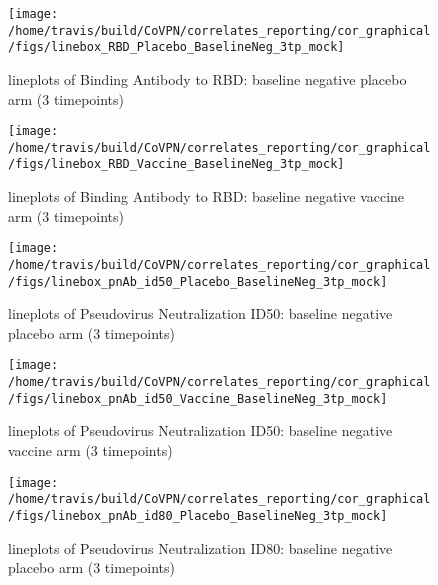 \documentclass[]{book}
\theoremstyle{definition}
\theoremstyle{definition}
\theoremstyle{definition}
\newcommand{\1}{\mathbbm{1}}
\begin{document}
\clearpage
\begin{figure}[H]

{\centering \texttt{[image: /home/travis/build/CoVPN/correlates\_reporting/cor\_graphical/figs/linebox\_RBD\_Placebo\_BaselineNeg\_3tp\_mock]} 

}

\caption{lineplots of Binding Antibody to RBD: baseline negative placebo arm (3 timepoints)}\label{fig:unnamed-chunk-45}
\end{figure}

\clearpage
\begin{figure}[H]

{\centering \texttt{[image: /home/travis/build/CoVPN/correlates\_reporting/cor\_graphical/figs/linebox\_RBD\_Vaccine\_BaselineNeg\_3tp\_mock]} 

}

\caption{lineplots of Binding Antibody to RBD: baseline negative vaccine arm (3 timepoints)}\label{fig:unnamed-chunk-46}
\end{figure}

\clearpage
\begin{figure}[H]

{\centering \texttt{[image: /home/travis/build/CoVPN/correlates\_reporting/cor\_graphical/figs/linebox\_pnAb\_id50\_Placebo\_BaselineNeg\_3tp\_mock]} 

}

\caption{lineplots of Pseudovirus Neutralization ID50: baseline negative placebo arm (3 timepoints)}\label{fig:unnamed-chunk-47}
\end{figure}

\clearpage
\begin{figure}[H]

{\centering \texttt{[image: /home/travis/build/CoVPN/correlates\_reporting/cor\_graphical/figs/linebox\_pnAb\_id50\_Vaccine\_BaselineNeg\_3tp\_mock]} 

}

\caption{lineplots of Pseudovirus Neutralization ID50: baseline negative vaccine arm (3 timepoints)}\label{fig:unnamed-chunk-48}
\end{figure}

\clearpage
\begin{figure}[H]

{\centering \texttt{[image: /home/travis/build/CoVPN/correlates\_reporting/cor\_graphical/figs/linebox\_pnAb\_id80\_Placebo\_BaselineNeg\_3tp\_mock]} 

}

\caption{lineplots of Pseudovirus Neutralization ID80: baseline negative placebo arm (3 timepoints)}\label{fig:unnamed-chunk-49}
\end{figure}
\end{document}
